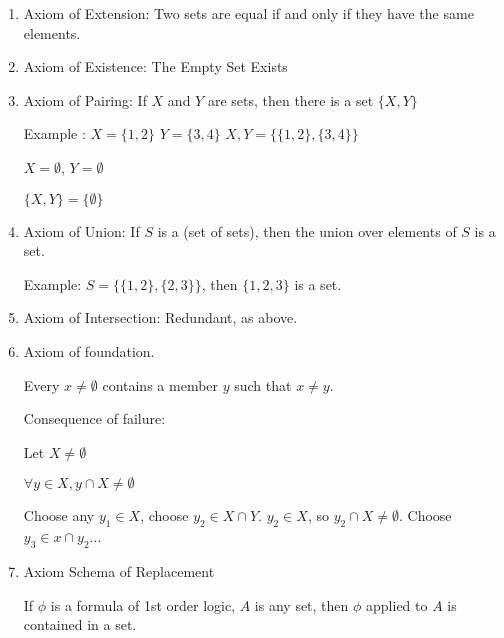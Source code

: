 \documentclass[twoside]{article}
\begin{document}
    \begin{enumerate}
        \item Axiom of Extension: 
        Two sets are equal if and only if they have the same elements. 

        \item Axiom of Existence:
        The Empty Set Exists

        \item Axiom of Pairing:
        If $X$ and $Y$ are sets, then there is a set $\{X, Y\}$

        Example : $X = \{1,2\}$         $Y = \{3,4\}$
        ${X,Y} = \{\{1,2\}, \{3,4\}\}$

        $X = \emptyset$, $Y = \emptyset$

        $\{X,Y\} = \{\emptyset\}$

        \item Axiom of Union:        If $S$ is a (set of sets), then the union over elements of $S$ is a set. 

        Example: $S = \{\{1,2\}, \{2,3\}\}$, then $\{1,2,3\}$ is a set. 

        \item Axiom of Intersection: Redundant, as above. 

        \item Axiom of foundation.

        Every $x \neq \emptyset$ contains a member $y$ such that $x \neq y$. 

        Consequence of failure:

        Let $X \neq \emptyset$

        $\forall y \in X, y \cap X \neq \emptyset$

        Choose any $y_1 \in X$, choose $y_2 \in X \cap Y$. $y_2 \in X$, so $y_2 \cap X \neq \emptyset$. Choose $y_3 \in x \cap y_2$...

        \item Axiom Schema of Replacement

        If $\phi$ is a formula of 1st order logic, $A$ is any set, then $\phi$ applied to $A$ is contained in a set. 

    \end{enumerate}
    
    
\end{document}
